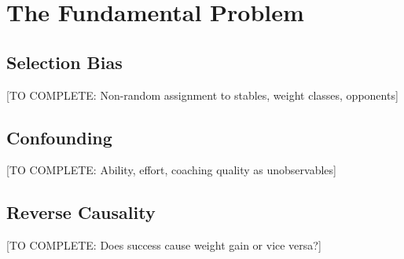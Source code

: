 \section{The Fundamental Problem}

\subsection{Selection Bias}

[TO COMPLETE: Non-random assignment to stables, weight classes, opponents]

\subsection{Confounding}

[TO COMPLETE: Ability, effort, coaching quality as unobservables]

\subsection{Reverse Causality}

[TO COMPLETE: Does success cause weight gain or vice versa?]